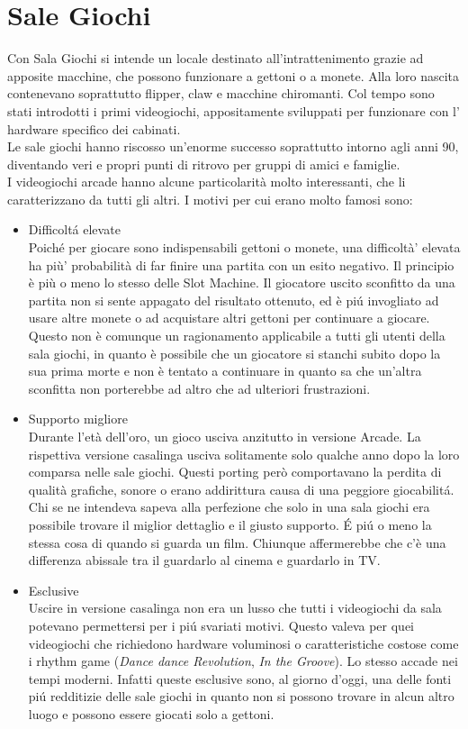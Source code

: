  \section{Sale Giochi}
Con Sala Giochi si intende un locale destinato all’intrattenimento grazie ad apposite macchine, che possono funzionare a gettoni o a monete. Alla loro nascita contenevano soprattutto flipper, \gls{claw} e macchine chiromanti. Col tempo sono stati introdotti i primi videogiochi, appositamente sviluppati per funzionare con l’ hardware specifico dei cabinati.\\Le sale giochi hanno riscosso un’enorme successo soprattutto intorno agli anni 90, diventando veri e propri punti di ritrovo per gruppi di amici e famiglie.\\I videogiochi arcade hanno alcune particolarità molto interessanti, che li caratterizzano da tutti gli altri. I motivi per cui erano molto famosi sono:
\begin{itemize}
\item Difficoltá elevate \\
Poiché per giocare sono indispensabili gettoni o monete, una difficoltà’ elevata ha più’ probabilità di far finire una partita con un esito negativo. Il principio è più o meno lo stesso delle Slot Machine. Il giocatore uscito sconfitto da una partita non si sente appagato del risultato ottenuto, ed è piú invogliato ad usare altre monete o ad acquistare altri gettoni per continuare a giocare. Questo non è comunque un ragionamento applicabile a tutti gli utenti della sala giochi, in quanto è possibile che un giocatore si stanchi subito dopo la sua prima morte e non è tentato a continuare in quanto sa che un’altra sconfitta non porterebbe ad altro che ad ulteriori frustrazioni.
\item Supporto migliore \\
Durante l’età dell’oro, un gioco usciva anzitutto in versione Arcade. La rispettiva versione casalinga usciva solitamente solo qualche anno dopo la loro comparsa nelle sale giochi. Questi porting però comportavano la perdita di qualità grafiche, sonore o erano addirittura causa di una peggiore giocabilitá. Chi se ne intendeva sapeva alla perfezione che solo in una sala giochi era possibile trovare il miglior dettaglio e il giusto supporto. É piú o meno la stessa cosa di quando si guarda un film. Chiunque affermerebbe che c’è una differenza abissale tra il guardarlo al cinema e guardarlo in TV.
\item Esclusive \\
Uscire in versione casalinga non era un lusso che tutti i videogiochi da sala potevano permettersi per i piú svariati motivi. Questo valeva per quei videogiochi che richiedono hardware voluminosi o caratteristiche costose come i rhythm game (\textit{Dance dance Revolution}, \textit{In the Groove}). Lo stesso accade nei tempi moderni. Infatti queste esclusive sono, al giorno d’oggi, una delle fonti piú redditizie delle sale giochi in quanto non si possono trovare in alcun altro luogo e possono essere giocati solo a gettoni.
\end{itemize}
\newpage
